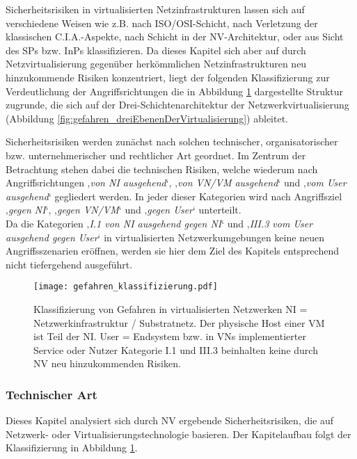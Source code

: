 Sicherheitsrisiken in virtualisierten Netzinfrastrukturen lassen sich auf verschiedene Weisen wie z.B. nach ISO/OSI-Schicht, nach Verletzung der klassischen C.I.A.-Aspekte, nach Schicht in der NV-Architektur, oder aus Sicht des SPs bzw. InPs klassifizieren. Da dieses Kapitel sich aber auf durch Netzvirtualisierung gegenüber herkömmlichen Netzinfrastrukturen neu hinzukommende Risiken konzentriert, liegt der folgenden Klassifizierung zur Verdeutlichung der Angriffsrichtungen die in Abbildung \ref{fig:gefahren_klassifizierung} dargestellte Struktur zugrunde, die sich auf der Drei-Schichtenarchitektur der Netzwerkvirtualisierung (Abbildung \ref{fig:gefahren_dreiEbenenDerVirtualisierung}) ableitet.

Sicherheitsrisiken werden zunächst nach solchen technischer, organisatorischer bzw. unternehmerischer und rechtlicher Art geordnet. Im Zentrum der Betrachtung stehen dabei die technischen Risiken, welche wiederum nach Angriffsrichtungen ‚\textit{von NI ausgehend}‘, ‚\textit{von VN/VM ausgehend}‘ und ‚\textit{vom User ausgehend}‘ gegliedert werden. In jeder dieser Kategorien wird nach Angriffsziel ‚\textit{gegen NI}‘, ‚\textit{gegen VN/VM}‘ und ‚\textit{gegen User}‘ unterteilt. \\
Da die Kategorien ‚\textit{I.1 von NI ausgehend gegen NI}‘ und ‚\textit{III.3 vom User ausgehend gegen User}‘ in virtualisierten Netzwerkumgebungen keine neuen Angriffsszenarien eröffnen, werden sie hier dem Ziel des Kapitels entsprechend nicht tiefergehend ausgeführt. 


\begin{figure}[htb]
	\begin{center}
	\texttt{[image: gefahren\_klassifizierung.pdf]}
	\caption{\label{fig:gefahren_klassifizierung} Klassifizierung von Gefahren in virtualisierten Netzwerken
		\newline NI = Netzwerkinfrastruktur / Substratnetz. Der physische Host einer VM ist Teil der NI.
		\newline User = Endsystem bzw. in VNs implementierter Service oder Nutzer
		\newline Kategorie I.1 und III.3 beinhalten keine durch NV neu hinzukommenden Risiken.}
	\end{center}
\end{figure}





\subsubsection{Technischer Art}
\label{subsubsec:gefahren_virt_technisch}
Dieses Kapitel analysiert sich durch NV ergebende Sicherheitsrisiken, die auf Netzwerk- oder Virtualisierungstechnologie basieren.
Der Kapitelaufbau folgt der Klassifizierung in Abbildung \ref{fig:gefahren_klassifizierung}. 


